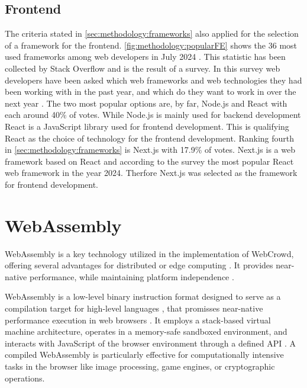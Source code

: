 \subsection{Frontend}
\label{subsec:methodology:frameworks:frontend}
The criteria stated in \autoref{sec:methodology:frameworks} also applied for the selection of a framework for the frontend. \autoref{fig:methodology:popularFE} shows the 36 most used frameworks among web developers in July 2024 \cite{frontend:popularity}. This statistic has been collected by Stack Overflow and is the result of a survey. In this survey web developers have been asked which web frameworks and web technologies they had been working with in the past year, and which do they want to work in over the next year \cite{frontend:popularity}. The two most popular options are, by far, Node.js and React with each around 40\% of votes. While Node.js is mainly used for backend development React is a JavaScript library used for frontend development. This is qualifying React as the choice of technology for the frontend development. Ranking fourth in \autoref{sec:methodology:frameworks} is Next.js with 17.9\% of votes. Next.js is a web framework based on React \cite{methodology:nextjs} and according to the survey the most popular React web framework in the year 2024. Therfore Next.js was selected as the framework for frontend development.

\section{WebAssembly}
\label{sec:methodology:wasm}
WebAssembly \cite{methodology:wasmW3C} is a key technology utilized in the implementation of WebCrowd, offering several advantages for distributed or edge computing \cite{relatedwork:wasmedgecomputing}. It provides near-native performance, while maintaining platform independence \cite{methodology:wasm, methodology:wasmW3C, relatedwork:wasmedgecomputing}. 

WebAssembly is a low-level binary instruction format designed to serve as a compilation target for high-level languages \cite{methodology:wasm, methodology:wasmW3C, methodology:wasm2}, that promisses near-native performance execution in web browsers \cite{methodology:wasm, methodology:wasmW3C, relatedwork:wasmedgecomputing}. It employs a stack-based virtual machine architecture, operates in a memory-safe sandboxed environment, and interacts with JavaScript of the browser environment through a defined \ac{API} \cite{methodology:wasm, methodology:wasmW3C, methodology:wasm2, methodology:wasmdocu}. A compiled WebAssembly is particularly effective for computationally intensive tasks in the browser \cite{methodology:wasm2, methodology:wasmW3C} like image processing, game engines, or cryptographic operations.

